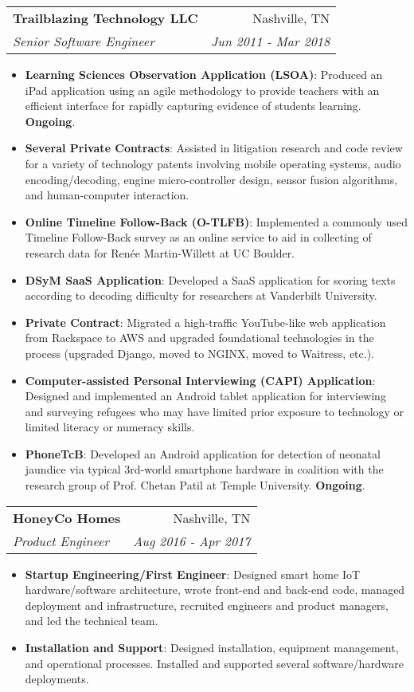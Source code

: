 \documentclass[letterpaper,10pt]{article}
\makeatletter
\newcommand{\resumeItem}[2]{
  \item\small{
    \textbf{#1}{: #2 \vspace{-2pt}}
  }
}
\newcommand{\resumeSubheading}[4]{
  \vspace{-1pt}\item
    \begin{tabular*}{0.97\textwidth}{l@{\extracolsep{\fill}}r}
      \textbf{#1} & #2 \\
      \textit{\small#3} & \textit{\small #4} \\
    \end{tabular*}\vspace{-5pt}
}
\newcommand{\resumeItemListStart}{\begin{itemize}}
\newcommand{\resumeItemListEnd}{\end{itemize}\vspace{-5pt}}
\makeatother
\begin{document}
    \resumeSubheading
      {Trailblazing Technology LLC}{Nashville, TN}
      {Senior Software Engineer}{Jun 2011 - Mar 2018}
      \resumeItemListStart
        \resumeItem{Learning Sciences Observation Application (LSOA)}
          {Produced an iPad application using an agile methodology to provide teachers with an efficient interface for rapidly capturing evidence of students learning. \textbf{Ongoing}.}
        \resumeItem{Several Private Contracts}
          {Assisted in litigation research and code review for a variety of technology patents involving mobile operating systems, audio encoding/decoding, engine micro-controller design, sensor fusion algorithms, and human-computer interaction.}
        \resumeItem{Online Timeline Follow-Back (O-TLFB)}
          {Implemented a commonly used Timeline Follow-Back survey as an online service to aid in collecting of research data for Renée Martin-Willett at UC Boulder.}
        \resumeItem{DSyM SaaS Application}
          {Developed a SaaS application for scoring texts according to decoding difficulty for researchers at Vanderbilt University.}
        \resumeItem{Private Contract}
          {Migrated a high-traffic YouTube-like web application from Rackspace to AWS and upgraded foundational technologies in the process (upgraded Django, moved to NGINX, moved to Waitress, etc.).}
        \resumeItem{Computer-assisted Personal Interviewing (CAPI) Application}
          {Designed and implemented an Android tablet application for interviewing and surveying refugees who may have limited prior exposure to technology or limited literacy or numeracy skills.}
        \resumeItem{PhoneTcB}
          {Developed an Android application for detection of neonatal jaundice via typical 3rd-world smartphone hardware in coalition with the research group of Prof. Chetan Patil at Temple University. \textbf{Ongoing}.}
      \resumeItemListEnd

    \resumeSubheading
      {HoneyCo Homes}{Nashville, TN}
      {Product Engineer}{Aug 2016 - Apr 2017}
      \resumeItemListStart
        \resumeItem{Startup Engineering/First Engineer}
          {Designed smart home IoT hardware/software architecture, wrote front-end and back-end code, managed deployment and infrastructure, recruited engineers and product managers, and led the technical team.}
        \resumeItem{Installation and Support}
          {Designed installation, equipment management, and operational processes. Installed and supported several software/hardware deployments.}
      \resumeItemListEnd
\end{document}
